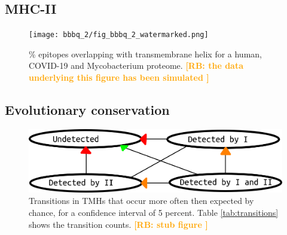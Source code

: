 \documentclass{article}
\newcommand{\richel}[1]{\textcolor{orange}{\textbf{[RB: #1]}}}
\begin{document}
\subsection{MHC-II}

\begin{figure}[!htbp]
  \texttt{[image: bbbq\_2/fig\_bbbq\_2\_watermarked.png]}
  \caption{
    \% epitopes overlapping with transmembrane helix
    for a human, COVID-19 and Mycobacterium proteome.
    \richel{
      the data underlying this figure has been simulated
    }
  }
  \label{fig:2}
\end{figure}

\subsection{Evolutionary conservation}

\begin{figure}[!htbp]
  \includegraphics[width=\textwidth]{transitions.png}
  \caption{
    Transitions in TMHs that occur more often then expected by chance,
    for a confidence interval of 5 percent.
    Table \ref{tab:transitions} shows the transition counts.
    \richel{
      stub figure
    }
  }
  \label{fig:transitions}
\end{figure}

\begin{table}[!htbp]
  
  \caption{
    Transitions counts, where the row indicates the source state,
    and the column indicates the target state.
    First number per cell is the observed number of this state transition,
    where the second number is the expected number of this state transition
    as predicted by chance.
    An asterisk behind the observed count indicates that this count
    is unlikely to be caused by chance only.
    Figure \ref{fig:transitions} shows which transition counts are 
    unlikely to be caused by chance only.
  }
  \label{tab:transitions}
\end{table}
\end{document}
